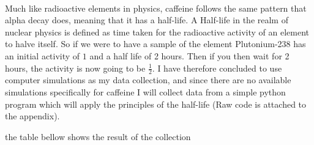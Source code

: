 \documentclass[12pt]{article}
\begin{document}
        \paragraph{}
                Much like radioactive elements in physics, caffeine follows the same pattern that alpha decay does, meaning that it has a half-life. A Half-life in the realm of nuclear physics is defined as time taken for the radioactive activity of an element to halve itself. So if we were to have a sample of the element Plutonium-238 has an initial activity of $1$ and a half life of 2 hours. Then if you then wait for 2 hours, the activity is now going to be {$\frac{1}{2}$}. I have therefore concluded to use computer simulations as my data collection, and since there are no available simulations specifically for caffeine I will collect data from a simple python program which will apply the principles of the half-life (Raw code is attached to the appendix). 
                
                \noindent the table bellow shows the result of the collection

                \begin{center}
                        \begin{tabular}{c c c c c}
                                
                        \end{tabular}
                \end{center}
                

        
\end{document}
